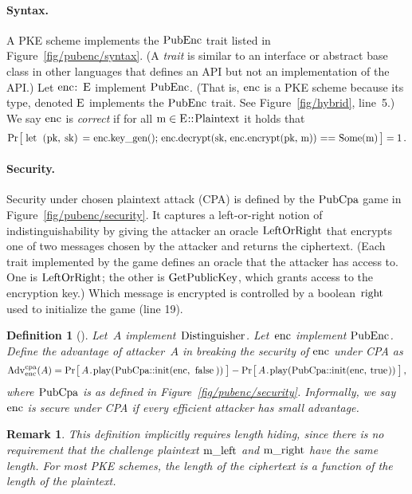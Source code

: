 \documentclass{article}
\newtheorem{definition}{Definition}
\newtheorem{remark}{Remark}
\newcommand{\Adv}[1]{\textrm{\textup{Adv}}^{\textup{#1}}}
\newcommand{\Prob}[1]{\Pr\hspace{-1pt}\big[\,#1\,\big]}
\newcommand{\code}[1]{\textrm{\textup{\lstinline{#1}}}}
\begin{document}
\paragraph{Syntax.}
%
A PKE scheme implements the $\code{PubEnc}$ trait listed in
Figure~\ref{fig/pubenc/syntax}.
%
(A \emph{trait} is similar to an interface or abstract base class in other
languages that defines an API but not an implementation of the API.)
%
Let $\code{enc: E}$ implement $\code{PubEnc}$.
%
(That is, $\code{enc}$ is a PKE scheme because its type, denoted $\code{E}$
implements the $\code{PubEnc}$ trait. See Figure~\ref{fig/hybrid}, line~5.)
%
We say $\code{enc}$ is \emph{correct} if for all $\code{m} \in
\code{E::Plaintext}$ it holds that
%
\[
  \Prob{
    \code{let (pk, sk) = enc.key_gen();
    enc.decrypt(sk, enc.encrypt(pk, m)) == Some(m)}
  } = 1 \,.
\]


\paragraph{Security.}
%
Security under chosen plaintext attack (CPA) is defined by the $\code{PubCpa}$
game in Figure~\ref{fig/pubenc/security}.
%
It captures a left-or-right notion of indistinguishability by giving the
attacker an oracle \hyperref[sec/traits]{$\code{LeftOrRight}$} that encrypts
one of two messages chosen by the attacker and returns the ciphertext.
%
(Each trait implemented by the game defines an oracle that the attacker has
access to. One is $\code{LeftOrRight}$; the other is
\hyperref[sec/traits]{$\code{GetPublicKey}$}, which grants access to the
encryption key.)
%
Which message is encrypted is controlled by a boolean $\code{right}$ used to
initialize the game (line 19).

\begin{definition}[{\cite[Definition 15.1]{joy}}]
  Let~$A$ implement \hyperref[sec/traits]{$\code{Distinguisher}$}.
  Let~$\code{enc}$ implement \hyperref[fig/pubenc/syntax]{$\code{PubEnc}$}.
  Define the advantage of attacker~$A$ in breaking the security of
  $\code{enc}$ under CPA as
  \[
    \Adv{cpa}_{\code{enc}}(A) =
      \Prob{A\code{.play(PubCpa::init(enc, false))}} -
      \Prob{A\code{.play(PubCpa::init(enc, true))}} \,,
  \]
  where $\code{PubCpa}$ is as defined in Figure~\ref{fig/pubenc/security}.
  Informally, we say $\code{enc}$ is secure under CPA if every efficient
  attacker has small advantage.
\end{definition}

\begin{remark}
  This definition implicitly requires length hiding, since there is no
  requirement that the challenge plaintext $\code{m_left}$ and $\code{m_right}$
  have the same length. For most PKE schemes, the length of the ciphertext is a
  function of the length of the plaintext.
\end{remark}
\end{document}
